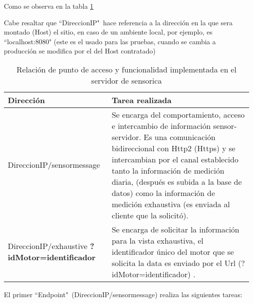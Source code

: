     Como se observa en la tabla \ref{tab:ServerSensorica}

    Cabe resaltar que ``DireccionIP"\ hace referencia a la dirección en la
    que sera montado (Host) el sitio, en caso de un ambiente local, por
    ejemplo, es ``localhost:8080" (este es el usado para las pruebas,
    cuando se cambia a producción se modifica por el del Host contratado)

    \begin{table}[ht]
        \begin{center}
        \caption[Funciones Servidor Sensorica]{ Relación de punto de acceso y
        funcionalidad implementada en el servidor de sensorica}
        \label{tab:ServerSensorica}

            \vspace{0.3cm}
            \begin{tabular}{|p{5cm}|p{10cm}|}
                \hline
                Dirección       & Tarea realizada
                \\\hline\hline
                DireccionIP/sensormessage &
                Se encarga del comportamiento, acceso
                e intercambio de información sensor-servidor. Es una comunicación
                bidireccional con Http2 (Https) y se intercambian por el canal
                establecido tanto la información de medición diaria, (después es
                subida a la base de datos) como la
                información de medición exhaustiva (es enviada al cliente que
                la solicitó).

                \\\hline
                DireccionIP/exhaustive \textbf{?idMotor=identificador}   &
                Se encarga de solicitar la información para la vista exhaustiva,
                el identificador único del motor que se solicita la data
                es enviado por el Url (?idMotor=identificador) .
                \\\hline
            \end{tabular}
        \end{center}
    \end{table}


    El primer ``Endpoint"\ (DireccionIP/sensormessage) realiza las siguientes tareas:

